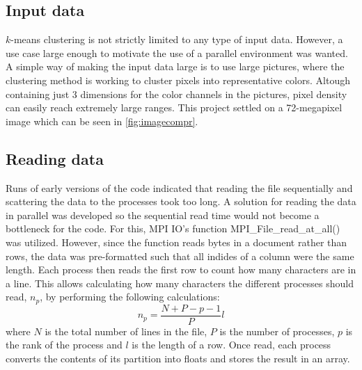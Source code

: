 
\subsection{Input data}

$k$-means clustering is not strictly limited to any type of input data.
However, a use case large enough to motivate the use of a parallel environment was wanted.
A simple way of making the input data large is to use large pictures,
where the clustering method is working to cluster pixels into representative colors.
Altough containing just 3 dimensions for the color channels in the pictures,
pixel density can easily reach extremely large ranges.
This project settled on a 72-megapixel image which can be seen in \cref{fig:imagecompr}.

\subsection{Reading data}

Runs of early versions of the code indicated that reading the file sequentially and scattering the data to the processes took too long. A solution for reading the data in parallel was developed so the sequential read time would not become a bottleneck for the code. For this, MPI IO's function MPI\_File\_read\_at\_all() was utilized. However, since the function reads bytes in a document rather than rows, the data was pre-formatted such that all indides of a column were the same length. Each process then reads the first row to count how many characters are in a line. This allows calculating how many characters the different processes should read, $n_{p}$, by performing the following calculations:
\begin{equation}
    n_{p} =  \frac{N + P - p - 1}{P} l
\end{equation}
where $N$ is the total number of lines in the file, $P$ is the number of processes, $p$ is the rank of the process and $l$ is the length of a row. Once read, each process converts the contents of its partition into floats and stores the result in an array.
